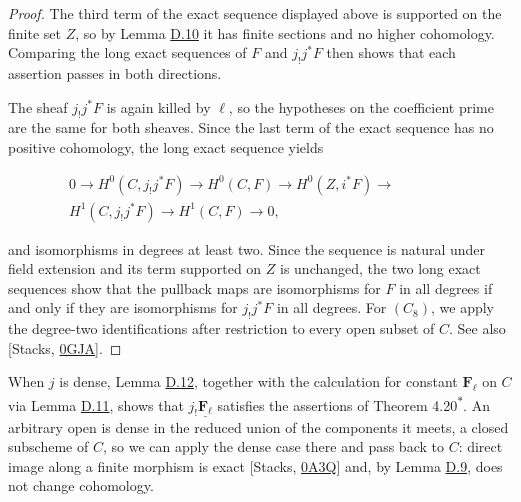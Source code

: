 \documentclass[11pt]{article}
\newcommand{\bpout}[1]{#1\textsuperscript{\hyperlink{bp-outside}{\ensuremath{\ast}}}}
\begin{document}
\begin{proof}[{Proof}]\label{bp213}%
The third term of the exact sequence displayed above is supported on the finite set \(Z\), so by Lemma \hyperref[bp204]{D.10} it has finite sections and no higher cohomology. Comparing the long exact sequences of \(F\) and \(j_!j^*F\) then shows that each assertion passes in both directions.

The sheaf \(j_!j^*F\) is again killed by \(\ell\), so the hypotheses on the coefficient prime are the same for both sheaves. Since the last term of the exact sequence has no positive cohomology, the long exact sequence yields

\[
\begin{split}
0\to H^0(C,j_!j^*F)\to H^0(C,F)\to H^0(Z,i^*F)\to{}\qquad\qquad\\
H^1(C,j_!j^*F)\to H^1(C,F)\to0,
\end{split}
\]

and isomorphisms in degrees at least two. Since the sequence is natural under field extension and its term supported on \(Z\) is unchanged, the two long exact sequences show that the pullback maps are isomorphisms for \(F\) in all degrees if and only if they are isomorphisms for \(j_!j^*F\) in all degrees. For \((C_8)\), we apply the degree-two identifications after restriction to every open subset of \(C\). See also [Stacks, \href{https://stacks.math.columbia.edu/tag/0GJA}{0GJA}].
\end{proof}

\label{bp214}%
When \(j\) is dense, Lemma \hyperref[bp212]{D.12}, together with the calculation for constant \(\mathbf F_\ell\) on \(C\) via Lemma \hyperref[bp207]{D.11}, shows that \(j_!\underline{\mathbf F_\ell}\) satisfies the assertions of Theorem \bpout{4.20}. An arbitrary open is dense in the reduced union of the components it meets, a closed subscheme of \(C\), so we can apply the dense case there and pass back to \(C\): direct image along a finite morphism is exact [Stacks, \href{https://stacks.math.columbia.edu/tag/0A3Q}{0A3Q}] and, by Lemma \hyperref[bp201]{D.9}, does not change cohomology.


\end{document}
